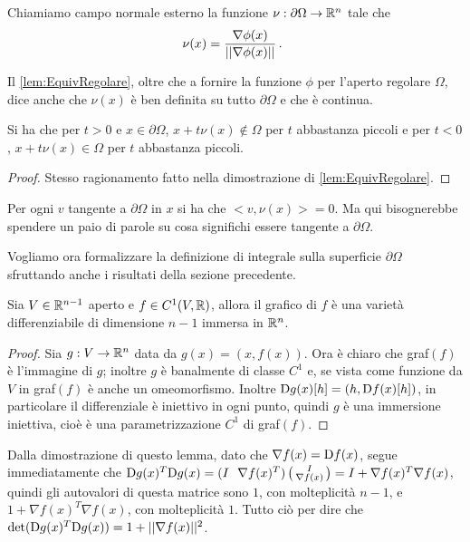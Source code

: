 \begin{definition}
	Chiamiamo campo normale esterno la funzione $\nu:\partial\Omega\rightarrow \mathbb R^n$ tale che
	\[
		\nu(x)=\frac{\nabla \phi(x)}{||\nabla \phi(x)||}\, \text{. }
	\]
\end{definition}

\begin{remark}
	Il \cref{lem:EquivRegolare}, oltre che a fornire la funzione $\phi$ per l'aperto regolare $\Omega$, dice anche che $\nu(x)$ è ben definita
	su tutto $\partial \Omega$ e che è continua.
\end{remark}

\begin{remark}
	Si ha che per $t>0$ e $x\in\partial\Omega$, $x+t\nu(x)\notin \Omega$ per $t$ abbastanza piccoli e per $t<0$, $x+t\nu(x)\in \Omega$ per $t$
	abbastanza piccoli.
\end{remark}
\begin{proof}
	Stesso ragionamento fatto nella dimostrazione di \cref{lem:EquivRegolare}.
\end{proof}

\begin{remark}
	Per ogni $v$ tangente a $\partial\Omega$ in $x$ si ha che $<v,\nu(x)>=0$. Ma qui bisognerebbe spendere un paio di parole su cosa significhi
	essere tangente a $\partial\Omega$.
\end{remark}


Vogliamo ora formalizzare la definizione di integrale sulla superficie $\partial\Omega$ sfruttando anche i risultati della sezione precedente.

\begin{lemma}\label{lem:GrapVar}
	Sia $V\in\mathbb R^{n-1}$ aperto e $f\in C^1(V,\mathbb R)$, allora il grafico di $f$ è una varietà differenziabile di dimensione $n-1$ immersa in $\mathbb R^n$.
\end{lemma}
\begin{proof}
	Sia $g:V\rightarrow \mathbb R^n$ data da $g(x)=(x,f(x))$. Ora è chiaro che graf$(f)$ è l'immagine di $g$; inoltre $g$ è banalmente di classe $C^1$
	e, se vista come funzione da $V$ in graf$(f)$ è anche un omeomorfismo. Inoltre $\mathrm D g(x)[h]=(h,\mathrm D f(x)[h])$, in particolare il differenziale è
	iniettivo in ogni punto, quindi $g$ è una immersione iniettiva, cioè è una parametrizzazione $C^1$ di graf$(f)$.
\end{proof}

\begin{remark}
	Dalla dimostrazione di questo lemma, dato che $\nabla f(x)=\mathrm D f(x)$, segue immediatamente che $\mathrm D g(x)^T \mathrm D g(x)=
	(I \ \ \nabla f(x)^T)
	\left(\begin{smallmatrix}
	I \\
	\nabla f(x)
	\end{smallmatrix}\right)=
	I+\nabla f(x)^T\nabla f(x)$, quindi gli autovalori di questa matrice sono $1$, con molteplicità $n-1$, e $1+\nabla f(x)^T\nabla f(x)$, con 
	molteplicità $1$. Tutto ciò per dire che $\det (\mathrm D g(x)^T \mathrm D g(x)) = 1+||\nabla f(x)||^2$. 
\end{remark}

